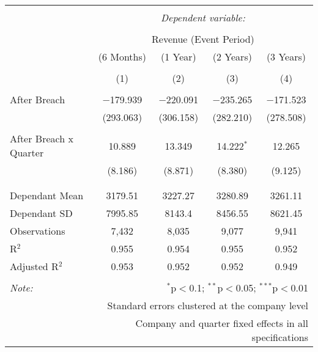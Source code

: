 
\begin{table}[!htbp] \centering 
  \caption{} 
  \label{} 
\begin{tabular}{@{\extracolsep{5pt}}lcccc} 
\\[-1.8ex]\hline 
\hline \\[-1.8ex] 
 & \multicolumn{4}{c}{\textit{Dependent variable:}} \\ 
\cline{2-5} 
\\[-1.8ex] & \multicolumn{4}{c}{Revenue (Event Period)} \\ 
 & (6 Months) & (1 Year) & (2 Years) & (3 Years) \\ 
\\[-1.8ex] & (1) & (2) & (3) & (4)\\ 
\hline \\[-1.8ex] 
 After Breach & $-$179.939 & $-$220.091 & $-$235.265 & $-$171.523 \\ 
  & (293.063) & (306.158) & (282.210) & (278.508) \\ 
  & & & & \\ 
 After Breach x Quarter & 10.889 & 13.349 & 14.222$^{*}$ & 12.265 \\ 
  & (8.186) & (8.871) & (8.380) & (9.125) \\ 
  & & & & \\ 
\hline \\[-1.8ex] 
Dependant Mean & 3179.51 & 3227.27 & 3280.89 & 3261.11 \\ 
Dependant SD & 7995.85 & 8143.4 & 8456.55 & 8621.45 \\ 
Observations & 7,432 & 8,035 & 9,077 & 9,941 \\ 
R$^{2}$ & 0.955 & 0.954 & 0.955 & 0.952 \\ 
Adjusted R$^{2}$ & 0.953 & 0.952 & 0.952 & 0.949 \\ 
\hline 
\hline \\[-1.8ex] 
\textit{Note:}  & \multicolumn{4}{r}{$^{*}$p$<$0.1; $^{**}$p$<$0.05; $^{***}$p$<$0.01} \\ 
 & \multicolumn{4}{r}{Standard errors clustered at the company level} \\ 
 & \multicolumn{4}{r}{Company and quarter fixed effects in all specifications} \\ 
\end{tabular} 
\end{table} 
